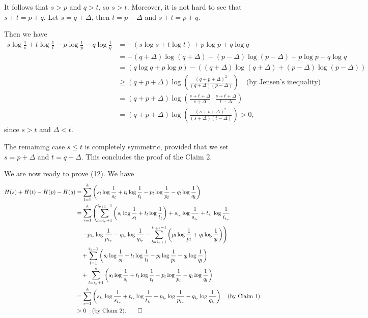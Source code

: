 It follows that $s > p$ and $q > t$, so $s > t$. Moreover, it is not hard to see that $s + t = p + q$. Let $s = q + \Delta$, then $t = p - \Delta$ and $s + t = p + q$.

Then we have
\begin{align*}
s \log \frac{1}{s} + t \log \frac{1}{t} - p \log \frac{1}{p} - q \log \frac{1}{q}
&= - (s \log s + t \log t) + p \log p + q \log q \\
&= - (q + \Delta) \log (q + \Delta) - (p - \Delta) \log (p - \Delta) + p \log p + q \log q \\
&= (q \log q + p \log p) - \left( (q + \Delta) \log (q + \Delta) + (p - \Delta) \log (p - \Delta) \right) \\
&\geq (q + p + \Delta) \log \left( \frac{(q + p + \Delta)^2}{(q + \Delta)(p - \Delta)} \right) \quad \text{(by Jensen's inequality)} \\
&= (q + p + \Delta) \log \left( \frac{s + t + \Delta}{s + \Delta} \cdot \frac{s + t + \Delta}{t - \Delta} \right) \\
&= (q + p + \Delta) \log \left( \frac{(s + t + \Delta)^2}{(s + \Delta)(t - \Delta)} \right) > 0,
\end{align*}
since $s > t$ and $\Delta < t$.

The remaining case $s \leq t$ is completely symmetric, provided that we set $s = p + \Delta$ and $t = q - \Delta$. This concludes the proof of the Claim 2.

We are now ready to prove (12). We have
\begin{align*}
H(s) + H(t) - H(p) - H(q)
&= \sum_{l=1}^{k} \left( s_l \log \frac{1}{s_l} + t_l \log \frac{1}{t_l} - p_l \log \frac{1}{p_l} - q_l \log \frac{1}{q_l} \right) \\
&= \sum_{r=1}^{k} \left( \sum_{l=i_r+1}^{i_{r+1}-1} \left( s_l \log \frac{1}{s_l} + t_l \log \frac{1}{t_l} \right)
+ s_{i_r} \log \frac{1}{s_{i_r}} + t_{i_r} \log \frac{1}{t_{i_r}} \right. \\
&\quad \left. - p_{i_r} \log \frac{1}{p_{i_r}} - q_{i_r} \log \frac{1}{q_{i_r}} 
- \sum_{l=i_r+1}^{i_{r+1}-1} \left( p_l \log \frac{1}{p_l} + q_l \log \frac{1}{q_l} \right) \right) \\
&\quad + \sum_{l=1}^{i_1 - 1} \left( s_l \log \frac{1}{s_l} + t_l \log \frac{1}{t_l} 
- p_l \log \frac{1}{p_l} - q_l \log \frac{1}{q_l} \right) \\
&\quad + \sum_{l=i_k+1}^{n} \left( s_l \log \frac{1}{s_l} + t_l \log \frac{1}{t_l} 
- p_l \log \frac{1}{p_l} - q_l \log \frac{1}{q_l} \right) \\
&= \sum_{r=1}^{k} \left( s_{i_r} \log \frac{1}{s_{i_r}} + t_{i_r} \log \frac{1}{t_{i_r}} 
- p_{i_r} \log \frac{1}{p_{i_r}} - q_{i_r} \log \frac{1}{q_{i_r}} \right) 
\quad \text{(by Claim 1)} \\
&> 0 \quad \text{(by Claim 2).} \qedhere
\end{align*}